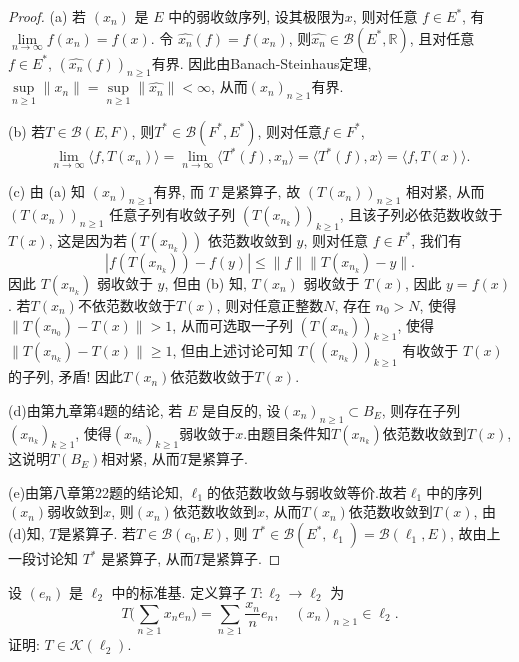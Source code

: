 \begin{proof}
    (a) 若 $(x_n)$ 是 $E$ 中的弱收敛序列, 设其极限为$x$, 
    则对任意 $f\in E^*$, 有 $\lim\limits_{n\rightarrow \infty}f(x_n)=f(x)$.
    令 $\widehat{x_n}(f)=f(x_n)$, 则$\widehat{x_n}\in\mathcal{B}(E^*,\mathbb{R})$, 
    且对任意 $f\in E^*$, $(\widehat{x_n}(f))_{n\geq 1}$有界. 因此由Banach-Steinhaus定理, 
    $\sup\limits_{n\geq 1}\|x_n\|=\sup\limits_{n\geq 1}\|\widehat{x_n}\|<\infty$, 
    从而$(x_n)_{n\geq 1}$有界. 

    (b) 若$T\in\mathcal{B}(E,F)$, 则$T^*\in\mathcal{B}(F^*,E^*)$, 则对任意$f\in F^*$, 
    \[\lim_{n\rightarrow \infty}\langle f,T(x_n)\rangle=\lim_{n\rightarrow \infty}\langle T^*(f),x_n\rangle=\langle T^*(f),x\rangle=\langle f,T(x)\rangle.\] 

    (c) 由 (a) 知 $(x_n)_{n\geq 1}$有界, 而 $T$ 是紧算子, 故 $(T(x_n))_{n\geq 1}$ 相对紧, 
    从而 $(T(x_n))_{n\geq 1}$ 任意子列有收敛子列 $(T(x_{n_k}))_{k\geq 1 }$, 
    且该子列必依范数收敛于 $T(x)$, 这是因为若$(T(x_{n_k}))$ 依范数收敛到 $y$, 
    则对任意 $f\in F^*$, 我们有
    \[|f(T(x_{n_k}))-f(y)|\leq \|f\|\|T(x_{n_k})-y\|.\]
    因此 $T(x_{n_k})$ 弱收敛于 $y$, 但由 (b) 知, $T(x_n)$ 弱收敛于 $T(x)$, 
    因此 $y=f(x)$. 若$T(x_n)$不依范数收敛于$T(x)$, 则对任意正整数$N$,
    存在 $n_0>N$, 使得 $\|T(x_{n_0})-T(x)\|>1$, 
    从而可选取一子列 $(T(x_{n_k}))_{k\geq 1}$, 使得 $\|T(x_{n_k})-T(x)\|\geq1$, 
    但由上述讨论可知 $T((x_{n_k}))_{k\geq 1}$ 有收敛于 $T(x)$ 的子列, 矛盾!
    因此$T(x_n)$依范数收敛于$T(x)$.

    (d)由第九章第4题的结论, 若 $E$ 是自反的, 设$(x_n)_{n\geq 1}\subset B_E$, 则存在子列$(x_{n_k})_{k\geq 1}$,
    使得$(x_{n_k})_{k\geq1}$弱收敛于$x$.由题目条件知$T(x_{n_k})$依范数收敛到$T(x)$, 这说明$T(B_E)$相对紧, 从而$T$是紧算子.

    (e)由第八章第22题的结论知, $\ell_1$的依范数收敛与弱收敛等价.故若$\ell_1$中的序列$(x_n)$弱收敛到$x$, 
    则$(x_n)$依范数收敛到$x$, 从而$T(x_n)$依范数收敛到$T(x)$, 由(d)知, $T$是紧算子. 
    若$T\in \mathcal{B}(c_0,E)$, 则 $T^*\in \mathcal{B}(E^*,\ell_1)=\mathcal{B}(\ell_1,E)$, 
    故由上一段讨论知 $T^*$ 是紧算子, 从而$T$是紧算子.
\end{proof}



\begin{exercise}
    设 $(e_n)$ 是 $\ell_2$ 中的标准基. 定义算子 $T:\ell_2\rightarrow \ell_2$ 为
    \[T\biggl(\sum_{n\geq 1}x_n e_n\biggr)=\sum_{n\geq 1}\dfrac{x_n}{n}e_n,\quad (x_n)_{n\geq 1}\in \ell_2.\]
    证明: $T\in \mathcal{K}(\ell_2)$.
\end{exercise}

